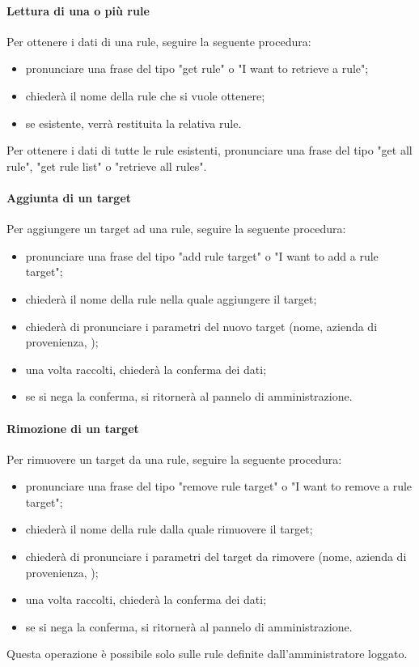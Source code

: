 \paragraph{Lettura di una o più rule}
Per ottenere i dati di una rule, seguire la seguente procedura:
\begin{itemize}
	\item pronunciare una frase del tipo "get rule" o "I want to retrieve a rule";
	\item \PROGETTO{} chiederà il nome della rule che si vuole ottenere;
	\item se esistente, verrà restituita la relativa rule.
\end{itemize}

Per ottenere i dati di tutte le rule esistenti, pronunciare una frase del tipo "get all rule", "get rule list" o "retrieve all rules".
\paragraph{Aggiunta di un target}\label{addRuleTarget}
Per aggiungere un target ad una rule, seguire la seguente procedura:
\begin{itemize}
	\item pronunciare una frase del tipo "add rule target" o "I want to add a rule target";
	\item \PROGETTO{} chiederà il nome della rule nella quale aggiungere il target;
	\item \PROGETTO{} chiederà di pronunciare i parametri del nuovo target (nome, azienda di provenienza, );
	\item una volta raccolti, \PROGETTO{} chiederà la conferma dei dati;
	\item se si nega la conferma, si ritornerà al pannelo di amministrazione.
\end{itemize}
\paragraph{Rimozione di un target}
Per rimuovere un target da una rule, seguire la seguente procedura:
\begin{itemize}
	\item pronunciare una frase del tipo "remove rule target" o "I want to remove a rule target";
	\item \PROGETTO{} chiederà il nome della rule dalla quale rimuovere il target;
	\item \PROGETTO{} chiederà di pronunciare i parametri del target da rimovere (nome, azienda di provenienza, );
	\item una volta raccolti, \PROGETTO{} chiederà la conferma dei dati;
	\item se si nega la conferma, si ritornerà al pannelo di amministrazione.
\end{itemize}
Questa operazione è possibile solo sulle rule definite dall'amministratore loggato.

